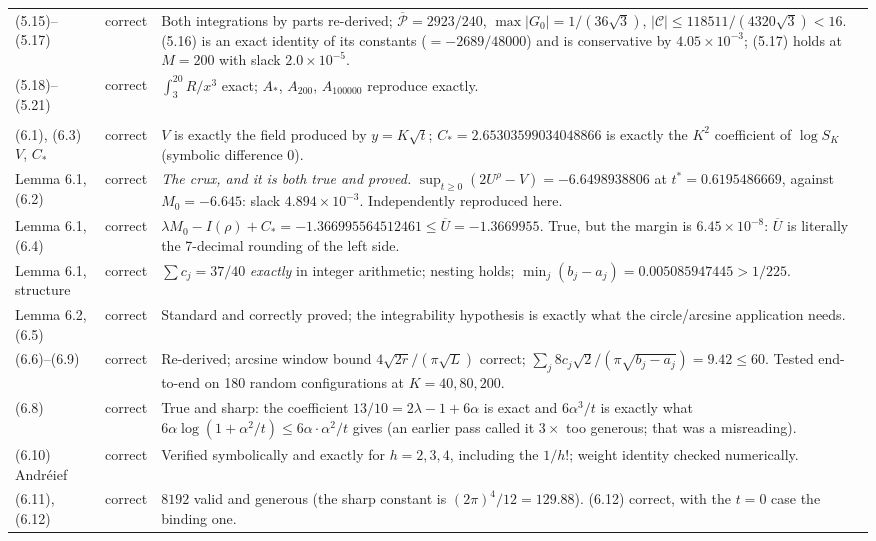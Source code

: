 \documentclass[11pt]{article}
\theoremstyle{definition}
\newcommand{\Ub}{\overline{U}}
\newcommand{\OK}{correct}
\begin{document}
\begin{longtable}{@{}p{2.55cm}p{1.75cm}p{9.5cm}@{}}
(5.15)--(5.17) & \OK & Both integrations by parts re-derived; $\overline{\mathcal P}=2923/240$, $\max|G_0|=1/(36\sqrt3)$, $|\mathcal{C}|\le118511/(4320\sqrt3)<16$. (5.16) is an exact identity of its constants ($=-2689/48000$) and is conservative by $4.05\times10^{-3}$; (5.17) holds at $M=200$ with slack $2.0\times10^{-5}$. \\
(5.18)--(5.21) & \OK & $\int_3^{20}R/x^3$ exact; $A_*$, $A_{200}$, $A_{100000}$ reproduce exactly. \\
\addlinespace
\multicolumn{3}{@{}l}{\textbf{Section 6}}\\
(6.1), (6.3) $V$, $C_*$ & \OK & $V$ is exactly the field produced by $y=K\sqrt t$; $C_*=2.65303599034048866$ is exactly the $K^2$ coefficient of $\log S_K$ (symbolic difference 0). \\
Lemma 6.1, (6.2) & \OK & \emph{The crux, and it is both true and proved.} $\sup_{t\ge0}(2U^\rho-V)=-6.6498938806$ at $t^*=0.6195486669$, against $M_0=-6.645$: slack $4.894\times10^{-3}$. Independently reproduced here. \\
Lemma 6.1, (6.4) & \OK & $\lambda M_0-I(\rho)+C_*=-1.366995564512461\le\Ub=-1.3669955$. True, but the margin is $6.45\times10^{-8}$: $\Ub$ is literally the 7-decimal rounding of the left side. \\
Lemma 6.1, structure & \OK & $\sum c_j=37/40$ \emph{exactly} in integer arithmetic; nesting holds; $\min_j(b_j-a_j)=0.005085947445>1/225$. \\
Lemma 6.2, (6.5) & \OK & Standard and correctly proved; the integrability hypothesis is exactly what the circle/arcsine application needs. \\
(6.6)--(6.9) & \OK & Re-derived; arcsine window bound $4\sqrt{2r}/(\pi\sqrt L)$ correct; $\sum_j 8c_j\sqrt2/(\pi\sqrt{b_j-a_j})=9.42\le60$. Tested end-to-end on 180 random configurations at $K=40,80,200$. \\
(6.8) & \OK & True and sharp: the coefficient $13/10=2\lambda-1+6\alpha$ is exact and $6\alpha^3/t$ is exactly what $6\alpha\log(1+\alpha^2/t)\le6\alpha\cdot\alpha^2/t$ gives (an earlier pass called it $3\times$ too generous; that was a misreading). \\
(6.10) Andr\'eief & \OK & Verified symbolically and exactly for $h=2,3,4$, including the $1/h!$; weight identity checked numerically. \\
(6.11), (6.12) & \OK & $8192$ valid and generous (the sharp constant is $(2\pi)^4/12=129.88$). (6.12) correct, with the $t=0$ case the binding one. \\

\end{longtable}
\end{document}

